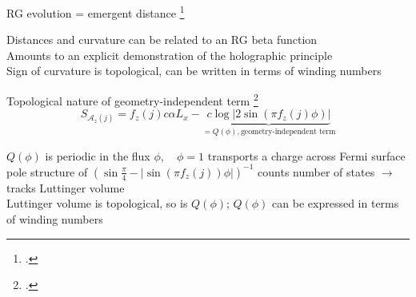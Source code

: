 \documentclass[9pt,aspectratio=169]{beamer}
\begin{document}
\begin{frame}{RG evolution = emergent distance}
	\footcite{maldacena1999large,ryu2006aspects,holzhey_1994}
\begin{itemize}
	\nitem Distances and curvature can be related to an RG \alert{beta function}\\[10pt]
	\nitem Amounts to an \alert{explicit demonstration} of the holographic principle\\[10pt]
	\nitem Sign of curvature is \alert{topological}, can be written in terms of winding numbers\\[10pt]
\end{itemize}
	
\end{frame}

\begin{frame}{Topological nature of geometry-independent term}
	\footcite{luttinger1960ground,luttinger1960fermi,oshikawa2000topological,seki2017topological,anirbanurg1,Heath_2020}
	\[S_{\mathcal{A}_z(j)} = f_z(j) c \alpha L_x - \underbrace{c \log \big|2\sin\left(\pi f_z(j)\phi\right)\big|}_{=Q(\phi),\text{geometry-independent term}}\]
	\begin{itemize}
	\nitem \(Q(\phi)\) is periodic in the flux \(\phi\), ~ \(\phi=1\) transports a charge across Fermi surface\\[10pt]
	\nitem pole structure of \(\left(\sin \frac{\pi}{4} - |\sin\left(\pi f_z(j)\right)\phi|\right)^{-1}\) counts number of states \(\longrightarrow\) tracks Luttinger volume\\[10pt]
	\nitem Luttinger volume is topological, so is \(Q(\phi)\); \(Q(\phi)\) can be expressed in terms of winding numbers
	\end{itemize}
	
\end{frame}
\end{document}
